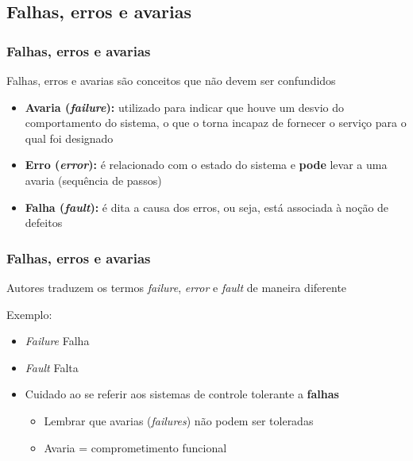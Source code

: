 \documentclass{beamer}
\begin{document}
\subsection{Falhas, erros e avarias}
\begin{frame}
    \frametitle{Falhas, erros e avarias}

    Falhas, erros e avarias são conceitos que não devem ser confundidos

\begin{itemize}
    \item \textbf{Avaria (\textit{failure}):} utilizado para indicar que houve
    um desvio do comportamento do sistema, o que o torna incapaz de fornecer o
    serviço para o qual foi designado
   
    \item \textbf{Erro (\textit{error}):} é relacionado com o estado do sistema
    e {\bf pode} levar a uma avaria (sequência de passos)
    
    \item \textbf{Falha (\textit{fault}):} é dita a causa dos erros, ou seja,
    está associada à noção de defeitos
\end{itemize}
\end{frame}

\begin{frame}
    \frametitle{Falhas, erros e avarias}

    Autores traduzem os termos {\it failure}, {\it error} e {\it fault} de
    maneira diferente

    \vspace{0.25cm}

    Exemplo:
\begin{itemize}
    \item {\it Failure} \implica Falha
    \item {\it Fault} \implica Falta
    \item Cuidado ao se referir aos sistemas de controle tolerante a {\bf
    falhas} 
    \begin{itemize}
        \item Lembrar que avarias ({\it failures}) não podem ser toleradas 
        \item Avaria = comprometimento funcional
    \end{itemize}
\end{itemize}
\end{frame}
\end{document}
